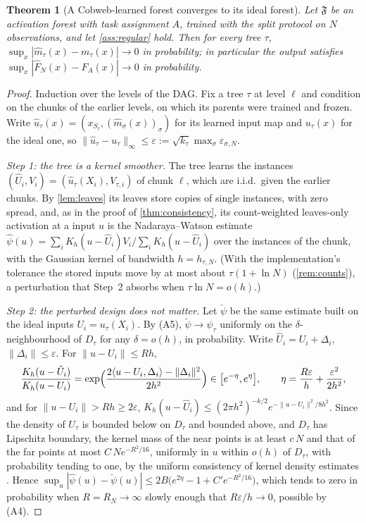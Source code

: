 \documentclass[11pt]{article}
\newtheorem{theorem}{Theorem}
\theoremstyle{definition}
\theoremstyle{remark}
\newcommand{\F}{\mathfrak{F}}
\begin{document}
\begin{theorem}[A Cobweb-learned forest converges to its ideal forest]\label{thm:ideal}
Let $\F$ be an activation forest with task assignment $A$, trained with the split
protocol on $N$ observations, and let \cref{ass:regular} hold.  Then for every tree
$\tau$, $\sup_x|\hat m_\tau(x)-m_\tau(x)|\to0$ in probability; in particular the output
satisfies $\sup_x|\hat F_N(x)-F_A(x)|\to0$ in probability.
\end{theorem}
\begin{proof}
Induction over the levels of the DAG.  Fix a tree $\tau$ at level $\ell$ and condition on
the chunks of the earlier levels, on which its parents were trained and frozen.  Write
$\hat u_\tau(x)=(x_{S_\tau},(\hat m_\sigma(x))_\sigma)$ for its learned input map and
$u_\tau(x)$ for the ideal one, so $\|\hat u_\tau-u_\tau\|_\infty\le\varepsilon:=
\sqrt{k_\tau}\max_\sigma\varepsilon_{\sigma,N}$.

\emph{Step 1: the tree is a kernel smoother.}  The tree learns the instances
$(\hat U_i,V_i)=(\hat u_\tau(X_i),V_{\tau,i})$ of chunk $\ell$, which are i.i.d.\ given
the earlier chunks.  By \cref{lem:leaves} its leaves store copies of single instances,
with zero spread, and, as in the proof of \cref{thm:consistency}, its count-weighted
leaves-only activation at a input $u$ is the Nadaraya--Watson estimate
$\hat\psi(u)=\sum_iK_h(u-\hat U_i)V_i/\sum_iK_h(u-\hat U_i)$ over the instances of the
chunk, with the Gaussian kernel of bandwidth $h=h_{\tau,N}$.  (With the implementation's
tolerance the stored inputs move by at most about $\tau(1+\ln N)$ (\cref{rem:counts}), a
perturbation that Step~2 absorbs when $\tau\ln N=o(h)$.)

\emph{Step 2: the perturbed design does not matter.}  Let $\check\psi$ be the same
estimate built on the ideal inputs $U_i=u_\tau(X_i)$.  By (A5), $\check\psi\to\psi_\tau$ uniformly on the $\delta$-neighbourhood of $D_\tau$ for
any $\delta=o(h)$, in probability.  Write $\hat U_i=U_i+\Delta_i$, $\|\Delta_i\|\le\varepsilon$.
For $\|u-U_i\|\le Rh$,
\[
  \frac{K_h(u-\hat U_i)}{K_h(u-U_i)}=\exp\Bigl(\frac{2\langle u-U_i,\Delta_i\rangle-\|\Delta_i\|^2}{2h^2}\Bigr)
  \in\bigl[e^{-\eta},e^{\eta}\bigr],\qquad \eta=\frac{R\varepsilon}{h}+\frac{\varepsilon^2}{2h^2},
\]
and for $\|u-U_i\|>Rh\ge2\varepsilon$, $K_h(u-\hat U_i)\le(2\pi h^2)^{-k/2}
e^{-\|u-U_i\|^2/8h^2}$.  Since the density of $U_\tau$ is bounded below on $D_\tau$ and
bounded above, and $D_\tau$ has Lipschitz boundary, the kernel mass of the near points
is at least $c\,N$ and that of the far points at most $C\,Ne^{-R^2/16}$, uniformly in $u$
within $o(h)$ of $D_\tau$, with probability tending to one, by the uniform consistency
of kernel density estimates \citep{einmahl2005}.
Hence $\sup_u|\hat\psi(u)-\check\psi(u)|\le2B\bigl(e^{2\eta}-1+C'e^{-R^2/16}\bigr)$, which
tends to zero in probability when $R=R_N\to\infty$ slowly enough that
$R\varepsilon/h\to0$, possible by (A4).


\end{proof}
\end{document}
